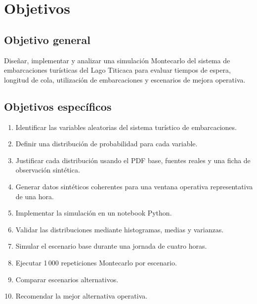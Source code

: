 \documentclass[12pt,a4paper]{article}
\begin{document}
\section{Objetivos}

\subsection{Objetivo general}

Diseñar, implementar y analizar una simulación Montecarlo del sistema de
embarcaciones turísticas del Lago Titicaca para evaluar tiempos de espera,
longitud de cola, utilización de embarcaciones y escenarios de mejora
operativa.

\subsection{Objetivos específicos}

\begin{enumerate}[noitemsep]
  \item Identificar las variables aleatorias del sistema turístico de
    embarcaciones.
  \item Definir una distribución de probabilidad para cada variable.
  \item Justificar cada distribución usando el PDF base, fuentes reales y
    una ficha de observación sintética.
  \item Generar datos sintéticos coherentes para una ventana operativa
    representativa de una hora.
  \item Implementar la simulación en un notebook Python.
  \item Validar las distribuciones mediante histogramas, medias y varianzas.
  \item Simular el escenario base durante una jornada de cuatro horas.
  \item Ejecutar 1\,000 repeticiones Montecarlo por escenario.
  \item Comparar escenarios alternativos.
  \item Recomendar la mejor alternativa operativa.
\end{enumerate}

\end{document}
